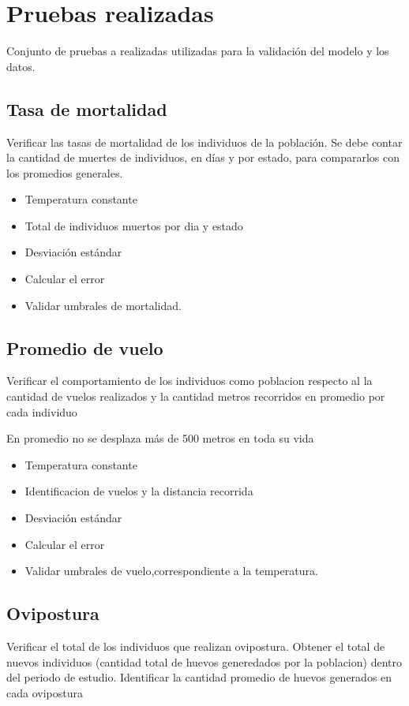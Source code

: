 \section{Pruebas realizadas}
Conjunto de pruebas a realizadas utilizadas para la validación del modelo y los datos.




\subsection{Tasa de mortalidad}
Verificar las tasas de mortalidad de los individuos de la población. Se debe contar la cantidad de muertes de individuos, en días y por estado, para compararlos con los promedios generales.

\begin{itemize}
    \item Temperatura constante 
    \item Total de individuos muertos por dia y estado
    \item Desviación estándar
    \item Calcular el error
    \item Validar umbrales de mortalidad.
\end{itemize}

\subsection{Promedio de vuelo}
Verificar el comportamiento de los individuos como poblacion respecto al 
la cantidad de vuelos realizados y la cantidad metros recorridos en promedio por cada individuo

En promedio no se desplaza más de 500 metros en toda su vida

\begin{itemize}
    \item Temperatura constante 
    \item Identificacion de vuelos y la distancia recorrida
    \item Desviación estándar
    \item Calcular el error
    \item Validar umbrales de vuelo,correspondiente a la temperatura.
\end{itemize}

\subsection{Ovipostura}
Verificar el total de los individuos que realizan ovipostura. Obtener el total de
nuevos individuos (cantidad total de huevos generedados por la poblacion) dentro 
del periodo de estudio. Identificar la cantidad promedio de huevos generados en cada ovipostura


